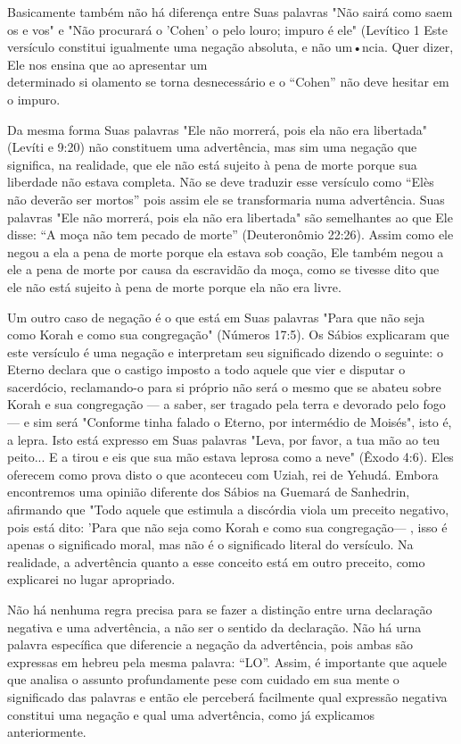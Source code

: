 Basicamente também não há diferença entre Suas palavras "Não sairá 
como saem os e vos" e "Não procurará o 'Cohen' o pelo louro; impuro
é ele" (Levítico 1 Este versículo constitui igualmente uma negação absoluta, 
e não um•ncia. Quer dizer, Ele nos ensina que ao apresentar um\\
determinado si olamento se torna desnecessário e o ``Cohen'' não deve 
hesitar em o impuro.

Da mesma forma Suas palavras "Ele não morrerá, pois ela não era
libertada" (Levíti e 9:20) não constituem uma advertência, mas sim uma
ne­gação que significa, na realidade, que ele não está sujeito à pena de
morte por­que sua liberdade não estava completa. Não se deve traduzir
esse versículo co­mo ``Elès não deverão ser mortos'' pois assim ele se
transformaria numa adver­tência. Suas palavras "Ele não morrerá, pois
ela não era libertada" são semelhantes 
ao que Ele disse: ``A moça não tem pecado de morte'' (Deuteronômio
22:26). Assim como ele negou a ela a pena de morte porque ela estava sob
coa­ção, Ele também negou a ele a pena de morte por causa da escravidão
da moça, como se tivesse dito que ele não está sujeito à pena de morte
porque ela não era livre.

Um outro caso de negação é o que está em Suas palavras "Para que não
seja como Korah e como sua congregação" (Números 17:5). Os Sábios
ex­plicaram que este versículo é uma negação e interpretam seu
significado dizen­do o seguinte: o Eterno declara que o castigo imposto
a todo aquele que vier e disputar o sacerdócio, reclamando-o para si
próprio não será o mesmo que se abateu sobre Korah e sua congregação ---
a saber, ser tragado pela terra e devorado pelo fogo --- e sim será
"Conforme tinha falado o Eterno, por inter­médio de Moisés", isto é, a
lepra. Isto está expresso em Suas palavras "Leva, por favor, a tua mão
ao teu peito... E a tirou e eis que sua mão estava leprosa como a neve"
(Êxodo 4:6). Eles oferecem como prova disto o que aconteceu com Uziah,
rei de Yehudá. Embora encontremos uma opinião diferente dos Sá­bios na
Guemará de Sanhedrin, afirmando que "Todo aquele que estimula a
discórdia viola um preceito negativo, pois está dito: 'Para que não seja
como Korah e como sua congregação--- , isso é apenas o
significado moral, mas não é o significado literal do versículo. Na
realidade, a advertência quanto a esse conceito está em outro preceito,
como explicarei no lugar apropriado.

Não há nenhuma regra precisa para se fazer a distinção entre urna
declaração negativa e uma advertência, a não ser o sentido da
declaração. Não há urna palavra específica que diferencie a negação da
advertência, pois ambas são expressas em hebreu pela mesma palavra:
``LO''. Assim, é importante que aquele que analisa o assunto profundamente
pese com cuidado em sua mente o significado das palavras e então ele
perceberá facilmente qual expressão ne­gativa constitui uma negação e
qual uma advertência, como já explicamos anteriormente.

